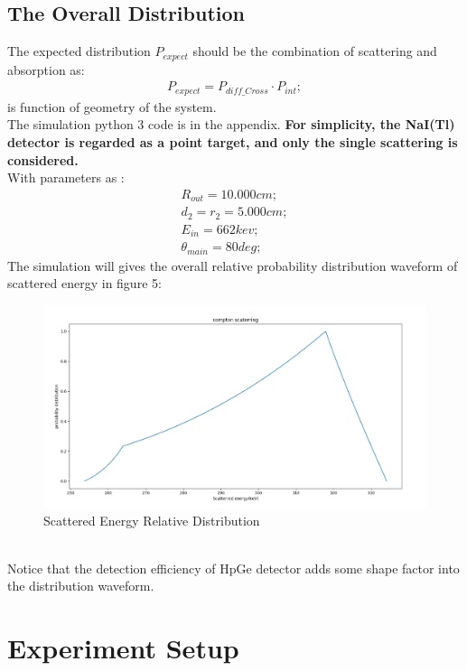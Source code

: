 \documentclass[12pt]{article}
\begin{document}
	\subsection{The Overall Distribution}
	The expected distribution $P_{expect}$ should be the combination of scattering and absorption as:
	\begin{gather}
		P_{expect}=P_{diff\_Cross}\cdot P_{int};
	\end{gather}
	is function of geometry of the system.\\
	The simulation python 3 code is in the appendix.\textbf{ For simplicity, the NaI(Tl) detector is regarded as a point target, and only the single scattering is considered.}\\
	 With parameters as :
	\begin{gather}
		R_{out}=10.000cm;\\
		d_2=r_2=5.000cm;\\
		E_{in}=662kev;\\
		\theta_{main}=80deg;
	\end{gather}
	The simulation will gives the overall relative probability distribution waveform of scattered energy in figure 5:
	\begin{figure}[h]
		\centering
		\includegraphics[width=0.7\linewidth]{pic/com_scat_R10_5x5_662kev_80deg}
		\caption{Scattered Energy Relative Distribution}
		\label{fig:comscatr105x5662kev80deg}
	\end{figure}\\
	Notice that the detection efficiency of HpGe detector adds some shape factor into the distribution waveform.
	\section{Experiment Setup}
\end{document}
